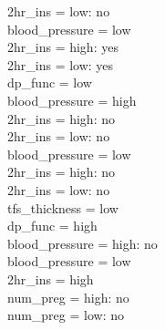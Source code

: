 \documentclass[12pt]{article}
\begin{document}
\textbar\quad \textbar\quad \textbar\quad \textbar\quad \textbar\quad \textbar\quad \textbar\quad 2hr\_ins = low: no\\
\textbar\quad \textbar\quad \textbar\quad \textbar\quad \textbar\quad \textbar\quad blood\_pressure = low\\
\textbar\quad \textbar\quad \textbar\quad \textbar\quad \textbar\quad \textbar\quad \textbar\quad 2hr\_ins = high: yes\\
\textbar\quad \textbar\quad \textbar\quad \textbar\quad \textbar\quad \textbar\quad \textbar\quad 2hr\_ins = low: yes\\
\textbar\quad \textbar\quad \textbar\quad \textbar\quad \textbar\quad dp\_func = low\\
\textbar\quad \textbar\quad \textbar\quad \textbar\quad \textbar\quad \textbar\quad blood\_pressure = high\\
\textbar\quad \textbar\quad \textbar\quad \textbar\quad \textbar\quad \textbar\quad \textbar\quad 2hr\_ins = high: no\\
\textbar\quad \textbar\quad \textbar\quad \textbar\quad \textbar\quad \textbar\quad \textbar\quad 2hr\_ins = low: no\\
\textbar\quad \textbar\quad \textbar\quad \textbar\quad \textbar\quad \textbar\quad blood\_pressure = low\\
\textbar\quad \textbar\quad \textbar\quad \textbar\quad \textbar\quad \textbar\quad \textbar\quad 2hr\_ins = high: no\\
\textbar\quad \textbar\quad \textbar\quad \textbar\quad \textbar\quad \textbar\quad \textbar\quad 2hr\_ins = low: no\\
\textbar\quad \textbar\quad \textbar\quad tfs\_thickness = low\\
\textbar\quad \textbar\quad \textbar\quad \textbar\quad dp\_func = high\\
\textbar\quad \textbar\quad \textbar\quad \textbar\quad \textbar\quad blood\_pressure = high: no\\
\textbar\quad \textbar\quad \textbar\quad \textbar\quad \textbar\quad blood\_pressure = low\\
\textbar\quad \textbar\quad \textbar\quad \textbar\quad \textbar\quad \textbar\quad 2hr\_ins = high\\
\textbar\quad \textbar\quad \textbar\quad \textbar\quad \textbar\quad \textbar\quad \textbar\quad num\_preg = high: no\\
\textbar\quad \textbar\quad \textbar\quad \textbar\quad \textbar\quad \textbar\quad \textbar\quad num\_preg = low: no\\
\end{document}
